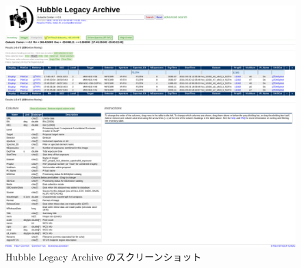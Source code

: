\documentclass[10pt,a4paper,dvipdfmx,uplatex]{jsarticle}
\begin{document}
\begin{figure}
  \centering
  \includegraphics[width=\linewidth,page=1]{img/HLA_screenshot.pdf}
  \caption{Hubble Legacy Archive のスクリーンショット}
  \label{fig:screen:hla}
\end{figure}
\end{document}
